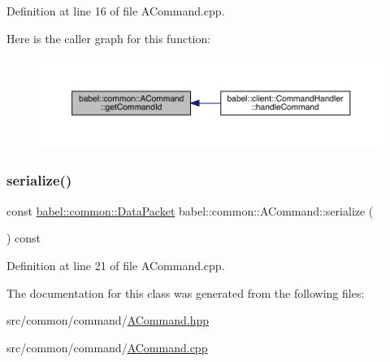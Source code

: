 Definition at line 16 of file A\+Command.\+cpp.

Here is the caller graph for this function\+:\nopagebreak
\begin{figure}[H]
\begin{center}
\leavevmode
\includegraphics[width=350pt]{classbabel_1_1common_1_1_a_command_aae2b10c516ccefc465061e1ad447c86b_icgraph}
\end{center}
\end{figure}
\mbox{\label{classbabel_1_1common_1_1_a_command_aec2d8980c55c923c587e6970de92564a}} 
\subsubsection{\texorpdfstring{serialize()}{serialize()}}
{\footnotesize\ttfamily const \mbox{\hyperlink{classbabel_1_1common_1_1_data_packet}{babel\+::common\+::\+Data\+Packet}} babel\+::common\+::\+A\+Command\+::serialize (\begin{DoxyParamCaption}{ }\end{DoxyParamCaption}) const}



Definition at line 21 of file A\+Command.\+cpp.



The documentation for this class was generated from the following files\+:\begin{DoxyCompactItemize}
\item 
src/common/command/\mbox{\hyperlink{_a_command_8hpp}{A\+Command.\+hpp}}\item 
src/common/command/\mbox{\hyperlink{_a_command_8cpp}{A\+Command.\+cpp}}\end{DoxyCompactItemize}
